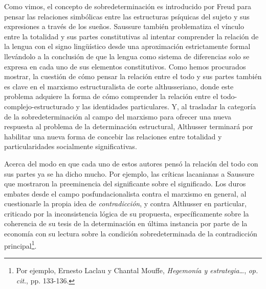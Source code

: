 \documentclass{book}
\begin{document}
Como vimos, el concepto de sobredeterminación es introducido por Freud
para pensar las relaciones simbólicas entre las estructuras psíquicas
del sujeto y sus expresiones a través de los sueños. Saussure también
problematiza el vínculo entre la totalidad y sus partes constitutivas al
intentar comprender la relación de la lengua con el signo lingüístico
desde una aproximación estrictamente formal llevándolo a la conclusión
de que la lengua como sistema de diferencias solo se expresa en cada uno
de sus elementos constitutivos. Como hemos procurados mostrar, la
cuestión de cómo pensar la relación entre el todo y sus partes también
es clave en el marxismo estructuralista de corte althusseriano, donde
este problema adquiere la forma de cómo comprender la relación entre el
todo-complejo-estructurado y las identidades particulares. Y, al
trasladar la categoría de la sobredeterminación al campo del marxismo
para ofrecer una nueva respuesta al problema de la determinación
estructural, Althusser terminará por habilitar una nueva forma de
concebir las relaciones entre totalidad y particularidades socialmente
significativas.

Acerca del modo en que cada uno de estos autores pensó la relación del
todo con sus partes ya se ha dicho mucho. Por ejemplo, las críticas
lacanianas a Saussure que mostraron la preeminencia del significante
sobre el significado. Los duros embates desde el campo
posfundacionalista contra el marxismo en general, al cuestionarle la
propia idea de \emph{contradicción}, y contra Althusser en particular,
criticado por la inconsistencia lógica de su propuesta, específicamente
sobre la coherencia de su tesis de la determinación en última instancia
por parte de la economía con su lectura sobre la condición
sobredeterminada de la contradicción principal\footnote{Por ejemplo,
  Ernesto Laclau y Chantal Mouffe, \emph{Hegemonía y estrategia}\ldots,
  \emph{op. cit}., pp. 133-136.}.
\end{document}
